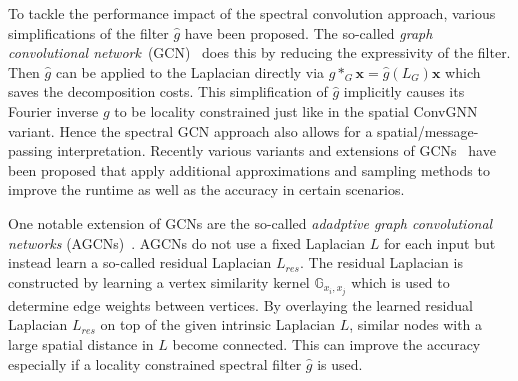 \documentclass[12pt]{scrartcl}
\begin{document}
\begin{enumerate}[label=\textbf{\arabic*.}]
\begin{enumerate}[label=\textbf{\alph*)}]
				To tackle the performance impact of the spectral convolution approach, various simplifications of the filter $\hat{g}$ have been proposed.
				The so-called \textit{graph convolutional network}~(GCN)~\cite{Kipf2017} does this by reducing the expressivity of the filter.
				Then $\hat{g}$ can be applied to the Laplacian directly via $g *_G \bm{x} = \hat{g}(L_G) \bm{x}$ which saves the decomposition costs.
				This simplification of $\hat{g}$ implicitly causes its Fourier inverse $g$ to be locality constrained just like in the spatial ConvGNN variant.
				Hence the spectral GCN approach also allows for a spatial/message-passing interpretation.
				Recently various variants and extensions of GCNs~\cite{Hamilton2017}\cite{Chen2018}\cite{Chen2017}\cite{Chiang2019}\cite{Du2017} have been proposed that apply additional approximations and sampling methods to improve the runtime as well as the accuracy in certain scenarios.

				One notable extension of GCNs are the so-called \textit{adadptive graph convolutional networks} (AGCNs)~\cite{Li2018}.
				AGCNs do not use a fixed Laplacian $L$ for each input but instead learn a so-called residual Laplacian $L_\mathit{res}$.
				The residual Laplacian is constructed by learning a vertex similarity kernel $\mathbb{G}_{x_i,x_j}$ which is used to determine edge weights between vertices.
				By overlaying the learned residual Laplacian $L_\mathit{res}$ on top of the given intrinsic Laplacian $L$, similar nodes with a large spatial distance in $L$ become connected.
				This can improve the accuracy especially if a locality constrained spectral filter $\hat{g}$ is used.
		\end{enumerate}


\end{enumerate}
\end{document}
